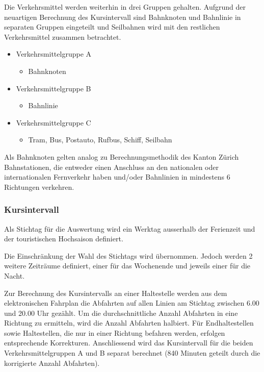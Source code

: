 Die Verkehrsmittel werden weiterhin in drei Gruppen gehalten.
Aufgrund der neuartigen Berechnung des Kursintervall sind Bahnknoten und Bahnlinie in separaten Gruppen eingeteilt und Seilbahnen wird mit den restlichen Verkehrsmittel zusammen betrachtet.

\begin{itemize}[noitemsep]
    \item Verkehrsmittelgruppe A
    \begin{itemize}
        \item Bahnknoten
    \end{itemize}
    \item Verkehrsmittelgruppe B
    \begin{itemize}
        \item Bahnlinie
    \end{itemize}
    \item Verkehrsmittelgruppe C
    \begin{itemize}
        \item Tram, Bus, Postauto, Rufbus, Schiff, Seilbahn
    \end{itemize}
\end{itemize}

Als Bahnknoten gelten analog zu Berechnungsmethodik des Kanton Zürich Bahnstationen, die entweder einen Anschluss an den nationalen oder internationalen Fernverkehr haben und/oder Bahnlinien in mindestens 6 Richtungen verkehren. 

\subsubsection{Kursintervall}
\label{Zusammenhang zur Berechnungsmethodik ARE:Kursintervall}

\begin{itquote}
Als Stichtag für die Auswertung wird ein Werktag ausserhalb der Ferienzeit und der touristischen Hochsaison definiert.
\end{itquote}

Die Einschränkung der Wahl des Stichtags wird übernommen.
Jedoch werden 2 weitere Zeiträume definiert, einer für das Wochenende und jeweils einer für die Nacht.

\begin{itquote}
Zur Berechnung des Kursintervalls an einer Haltestelle werden aus dem elektronischen Fahrplan die Abfahrten auf allen Linien am Stichtag zwischen 6.00 und 20.00 Uhr gezählt.
Um die durchschnittliche Anzahl Abfahrten in eine Richtung zu ermitteln, wird die Anzahl Abfahrten halbiert.
Für Endhaltestellen sowie Haltestellen, die nur in einer Richtung befahren werden, erfolgen entsprechende Korrekturen.
Anschliessend wird das Kursintervall für die beiden Verkehrsmittelgruppen A und B separat berechnet (840 Minuten geteilt durch die korrigierte Anzahl Abfahrten).
\end{itquote}


